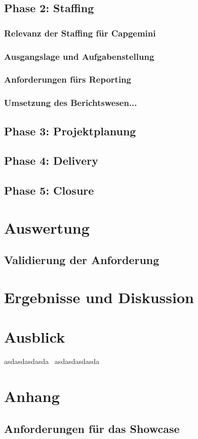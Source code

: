 \documentclass[a4paper, 12pt]{scrartcl}
\begin{document}
	\subsection{Phase 2: Staffing}
	\subsubsection{Relevanz der Staffing für Capgemini}%
	\subsubsection{Ausgangslage und Aufgabenstellung}
	\subsubsection{Anforderungen fürs Reporting}
	\subsubsection{Umsetzung des Berichtswesen...}
	\newpage
	\subsection{Phase 3: Projektplanung}
	\newpage
	\subsection{Phase 4: Delivery}
	\newpage
	\subsection{Phase 5: Closure}
	\newpage
	\section{Auswertung}
	\subsection{Validierung der Anforderung}%
	\newpage
	\section{Ergebnisse und Diskussion}
		\newpage
	\section{Ausblick}
	asdasdasdasda~\cite{karmasin2017gestaltung}
	asdasdasdasda~\cite{example2025}
		\newpage
	\section{Anhang}
	
	
	\subsection{Anforderungen für das Showcase}
\end{document}
